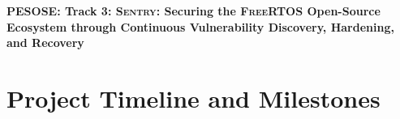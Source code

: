 \documentclass[11pt,oneside,onecolumn,letterpaper]{article}
\newcommand{\sysname}{{\scshape Sentry}\xspace}      %
\newcommand{\ose}{\textsc{FreeRTOS}\xspace}           %
\begin{document}

\begin{center}
{\large{\bf
PESOSE: Track 3: \sysname: Securing the \ose{} Open-Source Ecosystem through Continuous Vulnerability Discovery, Hardening, and Recovery}}
\end{center}















\section{Project Timeline and Milestones}
\end{document}
